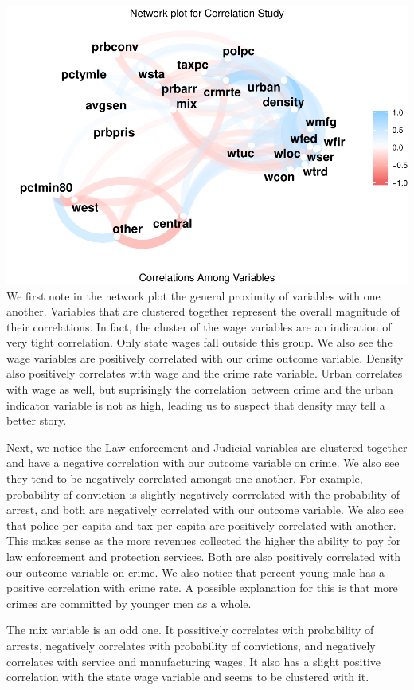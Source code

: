 \documentclass[]{article}
\begin{document}
\includegraphics{Bagnard_Gaustad_Hartman_Leung_Lab_3_files/figure-latex/unnamed-chunk-43-1.pdf}
We first note in the network plot the general proximity of variables
with one another. Variables that are clustered together represent the
overall magnitude of their correlations. In fact, the cluster of the
wage variables are an indication of very tight correlation. Only state
wages fall outside this group. We also see the wage variables are
positively correlated with our crime outcome variable. Density also
positively correlates with wage and the crime rate variable. Urban
correlates with wage as well, but suprisingly the correlation between
crime and the urban indicator variable is not as high, leading us to
suspect that density may tell a better story.

Next, we notice the Law enforcement and Judicial variables are clustered
together and have a negative correlation with our outcome variable on
crime. We also see they tend to be negatively correlated amongst one
another. For example, probability of conviction is slightly negatively
corrrelated with the probability of arrest, and both are negatively
correlated with our outcome variable. We also see that police per capita
and tax per capita are positively correlated with another. This makes
sense as the more revenues collected the higher the ability to pay for
law enforcement and protection services. Both are also positively
correlated with our outcome variable on crime. We also notice that
percent young male has a positive correlation with crime rate. A
possible explanation for this is that more crimes are committed by
younger men as a whole.

The mix variable is an odd one. It possitively correlates with
probability of arrests, negatively correlates with probability of
convictions, and negatively correlates with service and manufacturing
wages. It also has a slight positive correlation with the state wage
variable and seems to be clustered with it.
\end{document}
